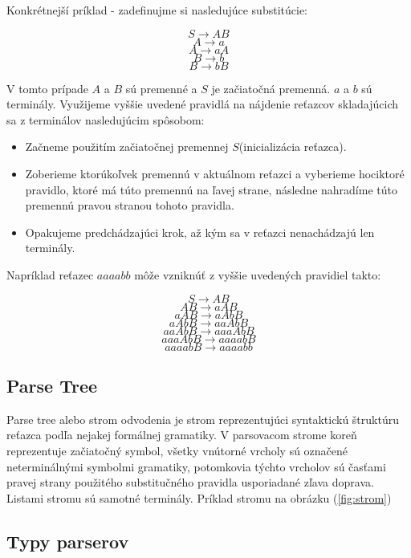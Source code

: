 \documentclass[12pt,a4paper]{report}
\theoremstyle{definition}
\theoremstyle{remark}
\begin{document}
\noindent Konkrétnejší príklad - zadefinujme si nasledujúce substitúcie:

$$ S \to AB $$
$$ A \to a $$
$$ A \to aA $$
$$ B \to b $$
$$ B \to bB $$

V tomto prípade $A$ a $B$ sú premenné a $S$ je začiatočná premenná. $a$ a $b$ sú terminály. Využijeme vyššie uvedené pravidlá na nájdenie reťazcov skladajúcich sa z terminálov nasledujúcim spôsobom:
\begin{itemize}
\item Začneme použitím začiatočnej premennej $S$(inicializácia reťazca).
\item Zoberieme ktorúkoľvek premennú v aktuálnom reťazci a vyberieme hociktoré pravidlo, ktoré má túto premennú na ľavej strane, následne nahradíme túto premennú pravou stranou tohoto pravidla.
\item Opakujeme predchádzajúci krok, až kým sa v reťazci nenachádzajú len terminály.
\end{itemize}

Napríklad reťazec $aaaabb$ môže vzniknúť z vyššie uvedených pravidiel takto:

$$ S \to AB $$
$$ AB \to aAB $$
$$ aAB \to aAbB $$
$$ aAbB \to aaAbB $$
$$ aaAbB \to aaaAbB $$
$$ aaaAbB \to aaaabB $$
$$ aaaabB \to aaaabb $$
\subsection{Parse Tree}
Parse tree alebo strom odvodenia je strom reprezentujúci syntaktickú štruktúru reťazca podľa nejakej formálnej gramatiky. V parsovacom strome koreň reprezentuje začiatočný symbol, všetky vnútorné vrcholy sú označené neterminálnými symbolmi gramatiky, potomkovia týchto vrcholov sú časťami pravej strany použitého substitučného pravidla usporiadané zľava doprava. Listami stromu sú samotné terminály. Príklad stromu na obrázku (\ref{fig:strom})
\subsection{Typy parserov}
\end{document}
